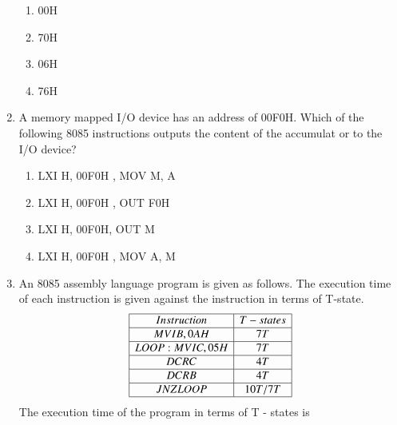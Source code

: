 \documentclass[journal,12pt,twocolumn]{IEEEtran}
\begin{document}
\begin{enumerate}
    \begin{enumerate}
      \item 00H
      \item 70H
      \item 06H
      \item 76H
    \end{enumerate}
    \item A memory mapped I/O device has an address of 00F0H. Which of the following 8085
instructions outputs the content of the accumulat or to the I/O device?
    \begin{enumerate}
      \item LXI H, 00F0H , MOV M, A
      \item LXI H, 00F0H , OUT F0H
      \item LXI H, 00F0H, OUT M
      \item LXI H, 00F0H , MOV A, M
    \end{enumerate}
    \item An 8085 assembly language program is given as follows. The execution time of each instruction
is given against the instruction in terms of T-state. 
\begin{displaymath}
\begin{array}{|c|c|} \hline

 Instruction  & T-states   \\\hline
 MVI B, 0AH & 7T           \\\hline
 LOOP: MVIC, 05H & 7T      \\\hline
 DCR C & 4T                \\\hline
 DCR B & 4T                \\\hline
 JNZ LOOP & 10T/7T         \\\hline
\end{array}
\end{displaymath}
The execution time of the program in terms of T - states is\\


\end{enumerate}
\end{document}
